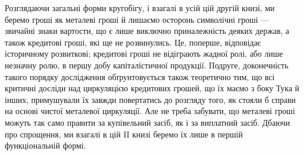 Розглядаючи загальні форми кругобігу, і взагалі в усій цій другій
книзі, ми беремо гроші як металеві гроші й лишаємо осторонь
символічні гроші — звичайні знаки вартости, що є лише виключно приналежність
деяких держав, а також кредитові гроші, які ще не розвинулись.
Це, поперше, відповідає історичному розвиткові; кредитові гроші
не відіграють жадної ролі, або лише незначну ролю, в першу добу капіталістичної
продукції. Подруге, доконечність такого порядку дослідження
обґрунтовується також теоретично тим, що всі критичні досліди над
циркуляцією кредитових грошей, що їх маємо з боку Тука й інших,
примушували їх завжди повертатись до розгляду того, як стояли б справи
на основі чистої металевої циркуляції. Але не треба забувати, що металеві
гроші можуть так само правити за купівельний засіб, як і за виплатний
засіб. Дбаючи про спрощення, ми взагалі в цій II книзі беремо їх лише
в першій функціональній формі.